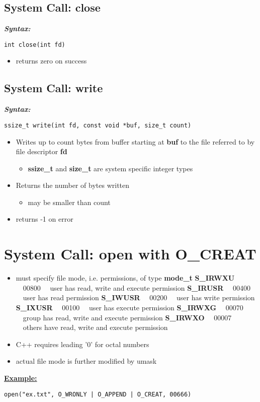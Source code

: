 \documentclass{report}
\begin{document}
\subsection{System Call: close}
\bigbreak \noindent
\textbf{\textit{Syntax:}}
\begin{verbatim}
int close(int fd)
\end{verbatim}
\begin{itemize}
  Closes file specified by \textbf{fd} file descriptor
  \begin{itemize}[label=$\circ$]
  Makes file descriptor available
  \end{itemize}
  \item returns zero on success
\end{itemize}
\subsection{System Call: write}
\bigbreak \noindent
\textbf{\textit{Syntax:}}
\begin{verbatim}
ssize_t write(int fd, const void *buf, size_t count)
\end{verbatim}
\begin{itemize}
  \item Writes up to count bytes from buffer starting at \textbf{buf} to the file referred to by file descriptor \textbf{fd}
    \begin{itemize}[label=$\circ$]
      \item \textbf{ssize\_t} and \textbf{size\_t} are system specific integer types
    \end{itemize}
  \item Returns the number of bytes written
    \begin{itemize}[label=$\circ$]
      \item may be smaller than count
    \end{itemize}
  \item returns -1 on error
\end{itemize}
\newpage
\section{System Call: open with O\_CREAT}
\begin{itemize}
\item must specify file mode, i.e. permissions, of type \textbf{mode\_t}
  \subitem \textbf{S\_IRWXU} \ \ 00800 \ \ user has read, write and execute permission
  \subitem \textbf{S\_IRUSR} \ \ 00400 \ \ user has read permission
  \subitem \textbf{S\_IWUSR} \ \ 00200 \ \ user has write permission
  \subitem \textbf{S\_IXUSR} \ \ 00100 \ \ user has execute permission
  \subitem \textbf{S\_IRWXG} \ \ 00070 \ \ group has read, write and execute permission
  \subitem \textbf{S\_IRWXO} \ \ 00007 \ \ others have read, write and execute permission
\item C++ requires leading '0' for octal numbers
\item actual file mode is further modified by umask
\end{itemize}
\bigbreak \noindent
\textbf{\underline{Example:}}
\begin{verbatim}
open("ex.txt", O_WRONLY | O_APPEND | O_CREAT, 00666)
\end{verbatim}
\end{document}
